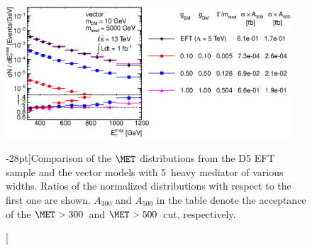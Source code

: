 %
%


\begin{figure}
\centering
\includegraphics[width=0.95\textwidth]{figures/monojet/scan_g_EFT_10_5000.eps}
\caption[][-28pt]{Comparison of the $\MET$ distributions from the D5 EFT sample and the vector models with 5~\tev heavy mediator of various widths. Ratios of the normalized distributions with respect to the first one are shown. $A_{300}$ and $A_{500}$ in the table denote the acceptance of the $\MET>300$~\gev and $\MET>500$~\gev cut, respectively.}
\label{fig:monojet_narrow}
\end{figure}

